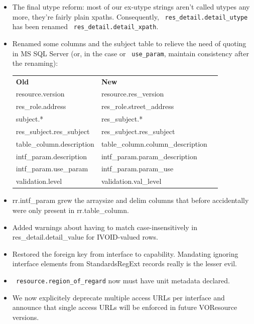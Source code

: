 \documentclass[11pt,a4paper]{ivoa}
\newcommand{\rtent}[1]{\texttt{\color{rtcolor} #1}}
\begin{document}
\begin{itemize}

\item The final utype reform: most of our ex-utype strings aren't called utypes
  any more, they're fairly plain xpaths.  Consequently, 
  \rtent{res\_detail.detail\_utype} has been renamed 
  \rtent{res\_detail.detail\_xpath}.{}

\item Renamed some columns and the subject table to relieve the need of quoting
  in MS SQL Server (or, in the case or \rtent{use\_param}, maintain
  consistency after the renaming):\\

\begin{tabular}{lll}

\textbf{Old}&
\textbf{New}\\
resource.version&resource.res\_version\\
res\_role.address&res\_role.street\_address\\
subject.*&res\_subject.*\\
res\_subject.res\_subject&res\_subject.res\_subject\\
table\_column.description&table\_column.column\_description\\
intf\_param.description&intf\_param.param\_description\\
intf\_param.use\_param&intf\_param.param\_use\\
validation.level&validation.val\_level\\

\end{tabular}

\item rr.intf\_param grew the arraysize and delim columns that before
    accidentally were only present in rr.table\_column.{}

\item Added warnings about having to match case-insensitively in
  res\_detail.detail\_value for IVOID-valued rows.{}

\item Restored the foreign key from interface to capability.  Mandating
  ignoring interface elements from StandardsRegExt records really is the
  lesser evil.{}

\item \rtent{resource.region\_of\_regard} now must have unit metadata
  declared.{}

\item We now explicitely deprecate multiple access URLs per interface
  and announce that single access URLs will be enforced in future
  VOResource versions.{}

\end{itemize}
\end{document}
